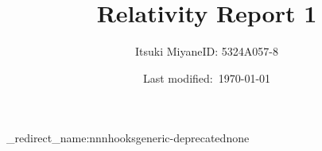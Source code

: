 \usepackage[T1]{fontenc}
\usepackage{tgtermes}

\setcounter{tocdepth}{3}

\usepackage{a4wide}

\usepackage{amssymb,amsfonts,amsthm,mathtools}
\usepackage{physics,braket,bm,slashed}

\usepackage[normalem]{ulem}

\usepackage{cancel}

\usepackage{fancybox,ascmac}

\theoremstyle{definition}
\newtheorem{dfn}{Definition}
\newtheorem{prop}{Proposition}
\newtheorem{thm}{Theorem}

\renewcommand{\proofname}{\textbf{Proof}}
\renewcommand{\qedsymbol}{$\blacksquare$}

\usepackage{silence}
\ExplSyntaxOn
\msg_redirect_name:nnn{hooks}{generic-deprecated}{none}
\ExplSyntaxOff


\usepackage{url,hyperref}
\usepackage[dvipsnames,svgnames]{xcolor}
\hypersetup{colorlinks=true,citecolor=FireBrick,linkcolor=Navy,urlcolor=purple}

\usepackage{tikz,pgf,pgfplots,circuitikz}
\pgfplotsset{compat=1.15}
\usetikzlibrary{intersections, arrows.meta, angles, calc, 3d, decorations.pathmorphing}
\usepackage[compat=1.1.0]{tikz-feynhand}

\makeatletter
   \renewcommand{\theequation}{$\thesection.\arabic{equation}$}
   
   \renewcommand{\thefigure}{\thesection.\arabic{figure}}
   
   \renewcommand{\thetable}{\thesection.\arabic{table}}
\makeatother



\renewcommand{\thefootnote}{$\ast$\arabic{footnote}}

\title{Relativity Report 1}
\author{Itsuki Miyane\quad ID: 5324A057-8}
\date{Last modified:\ \today}
